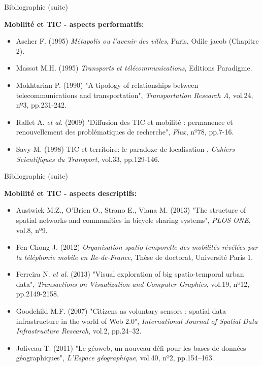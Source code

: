 \documentclass{beamer}
\begin{document}
\begin{frame}{Bibliographie (suite)}

\textbf{Mobilité et TIC - aspects performatifs:}

\footnotesize
\begin{itemize}
  \item Ascher F. (1995) \emph{Métapolis ou l’avenir des villes}, Paris, Odile jacob (Chapitre 2).
  \item Massot M.H. (1995) \emph{Transports et télécommunications}, Editions Paradigme.
  \item Mokhtarian P. (1990) "A tipology of relationships between telecommunications and transportation", \emph{Transportation Research A}, vol.24, nº3, pp.231-242.
  \item Rallet A. \emph{et al.} (2009) "Diffusion des TIC et mobilité : permanence et renouvellement des problématiques de recherche", \emph{Flux}, nº78, pp.7-16.
  \item Savy M. (1998) \og TIC et territoire: le paradoxe de localisation \fg{}, \textit{Cahiers Scientifiques du Transport}, vol.33, pp.129-146.
\end{itemize}

\normalsize
\end{frame}


\begin{frame}{Bibliographie (suite)}

\textbf{Mobilité et TIC - aspects descriptifs:}

\footnotesize
\begin{itemize}
  \item Austwick M.Z., O'Brien O., Strano E., Viana M. (2013) "The structure of spatial networks and communities in bicycle sharing systems", \textit{PLOS ONE}, vol.8, nº9.
  \item Fen-Chong J. (2012) \textit{Organisation spatio-temporelle des mobilités révélées par la téléphonie mobile en Île-de-France}, Thèse de doctorat, Université Paris 1.
  \item Ferreira N. \emph{et al.} (2013) "Visual exploration of big spatio-temporal urban data", \emph{Transactions on Visualization and Computer Graphics}, vol.19, nº12, pp.2149-2158.
  \item Goodchild M.F. (2007) "Citizens as voluntary sensors : spatial data infrastructure in the world of Web 2.0", \emph{International Journal of Spatial Data Infrastructure Research}, vol.2, pp.24–32.
  \item Joliveau T. (2011) "Le géoweb, un nouveau défi pour les bases de données géographiques", \emph{L'Espace géographique}, vol.40, nº2, pp.154–163.
\end{itemize}

\normalsize
\end{frame}
\end{document}
